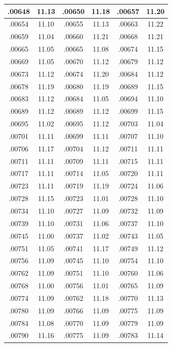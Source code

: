 \documentclass[10pt,twoside]{report}
\begin{document}
\begin{appendices}
\begin{longtable}{|c|c||c|c||c|c|}
.00648 & 11.13 & .00650 & 11.18 & .00657 & 11.20\\\hline
.00654 & 11.10 & .00655 & 11.13 & .00663 & 11.22\\\hline
.00659 & 11.04 & .00660 & 11.21 & .00668 & 11.21\\\hline
.00665 & 11.05 & .00665 & 11.08 & .00674 & 11.15\\\hline
.00669 & 11.05 & .00670 & 11.12 & .00679 & 11.12\\\hline
.00673 & 11.12 & .00674 & 11.20 & .00684 & 11.12\\\hline
.00678 & 11.19 & .00680 & 11.19 & .00689 & 11.15\\\hline
.00683 & 11.12 & .00684 & 11.05 & .00694 & 11.10\\\hline
.00689 & 11.12 & .00689 & 11.12 & .00699 & 11.15\\\hline
.00695 & 11.02 & .00695 & 11.12 & .00703 & 11.04\\\hline
.00701 & 11.11 & .00699 & 11.11 & .00707 & 11.10\\\hline
.00706 & 11.17 & .00704 & 11.12 & .00711 & 11.11\\\hline
.00711 & 11.11 & .00709 & 11.11 & .00715 & 11.11\\\hline
.00717 & 11.11 & .00714 & 11.05 & .00720 & 11.11\\\hline
.00723 & 11.11 & .00719 & 11.19 & .00724 & 11.06\\\hline
.00728 & 11.15 & .00723 & 11.01 & .00728 & 11.10\\\hline
.00734 & 11.10 & .00727 & 11.09 & .00732 & 11.09\\\hline
.00739 & 11.10 & .00731 & 11.06 & .00737 & 11.10\\\hline
.00745 & 11.00 & .00737 & 11.02 & .00743 & 11.05\\\hline
.00751 & 11.05 & .00741 & 11.17 & .00749 & 11.12\\\hline
.00756 & 11.09 & .00745 & 11.10 & .00754 & 11.10\\\hline
.00762 & 11.09 & .00751 & 11.10 & .00760 & 11.06\\\hline
.00768 & 11.00 & .00756 & 11.01 & .00765 & 11.09\\\hline
.00774 & 11.09 & .00762 & 11.18 & .00770 & 11.13\\\hline
.00780 & 11.09 & .00766 & 11.09 & .00775 & 11.09\\\hline
.00784 & 11.08 & .00770 & 11.09 & .00779 & 11.09\\\hline
.00790 & 11.16 & .00775 & 11.09 & .00783 & 11.14\\\hline

\end{longtable}
\end{appendices}
\end{document}
